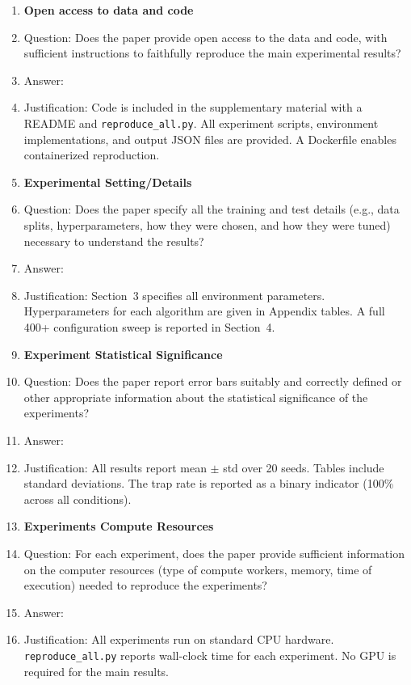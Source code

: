 \begin{enumerate}
\item {\bf Open access to data and code}
    \item[] Question: Does the paper provide open access to the data and code, with sufficient instructions to faithfully reproduce the main experimental results?
    \item[] Answer: \answerYes{}
    \item[] Justification: Code is included in the supplementary material with a README and \texttt{reproduce\_all.py}. All experiment scripts, environment implementations, and output JSON files are provided. A Dockerfile enables containerized reproduction.

\item {\bf Experimental Setting/Details}
    \item[] Question: Does the paper specify all the training and test details (e.g., data splits, hyperparameters, how they were chosen, and how they were tuned) necessary to understand the results?
    \item[] Answer: \answerYes{}
    \item[] Justification: Section~3 specifies all environment parameters. Hyperparameters for each algorithm are given in Appendix tables. A full 400+ configuration sweep is reported in Section~4.

\item {\bf Experiment Statistical Significance}
    \item[] Question: Does the paper report error bars suitably and correctly defined or other appropriate information about the statistical significance of the experiments?
    \item[] Answer: \answerYes{}
    \item[] Justification: All results report mean $\pm$ std over 20 seeds. Tables include standard deviations. The trap rate is reported as a binary indicator (100\% across all conditions).

\item {\bf Experiments Compute Resources}
    \item[] Question: For each experiment, does the paper provide sufficient information on the computer resources (type of compute workers, memory, time of execution) needed to reproduce the experiments?
    \item[] Answer: \answerYes{}
    \item[] Justification: All experiments run on standard CPU hardware. \texttt{reproduce\_all.py} reports wall-clock time for each experiment. No GPU is required for the main results.


\end{enumerate}
